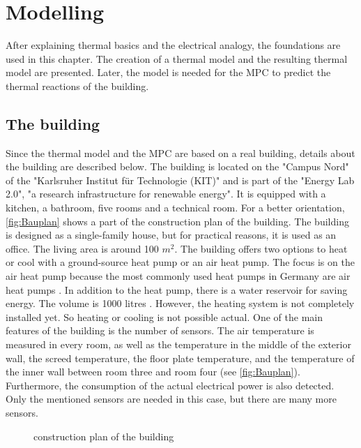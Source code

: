 \chapter{Modelling}
\label{ch:modelling}
After explaining thermal basics and the electrical analogy, the foundations are used in this chapter. The creation of a thermal model and the resulting thermal model are presented. Later, the model is needed for the MPC to predict the thermal reactions of the building.

\section{The building}
\label{section:building}
    Since the thermal model and the MPC are based on a real building, details about the building are described below.
    \newline
    The building is located on the "Campus Nord" of the "Karlsruher Institut für Technologie (KIT)" and is part of the "Energy Lab 2.0", "a research infrastructure for renewable energy"\cite{KIT.2021}. It is equipped with a kitchen, a bathroom, five rooms and a technical room. For a better orientation, \autoref{fig:Bauplan} shows a part of the construction plan of the building. The building is designed as a single-family house, but for practical reasons, it is used as an office. The living area is around 100 $m^2$. The building offers two options to heat or cool with a ground-source heat pump or an air heat pump. The focus is on the air heat pump because the most commonly used heat pumps in Germany are air heat pumps \cite{bwp.2021}. In addition to the heat pump, there is a water reservoir for saving energy. The volume is 1000 litres \cite{Oskar}. However, the heating system is not completely installed yet. So heating or cooling is not possible actual.
    \newline
    One of the main features of the building is the number of sensors. The air temperature is measured in every room, as well as the temperature in the middle of the exterior wall, the screed temperature, the floor plate temperature, and the temperature of the inner wall between room three and room four (see \autoref{fig:Bauplan}). Furthermore, the consumption of the actual electrical power is also detected. Only the mentioned sensors are needed in this case, but there are many more sensors.
    \begin{figure}
        \centering
        \def\svgwidth{320pt}
        
        \caption{construction plan of the building \cite{Bauplan}}
        \label{fig:Bauplan}
    \end{figure}
    
